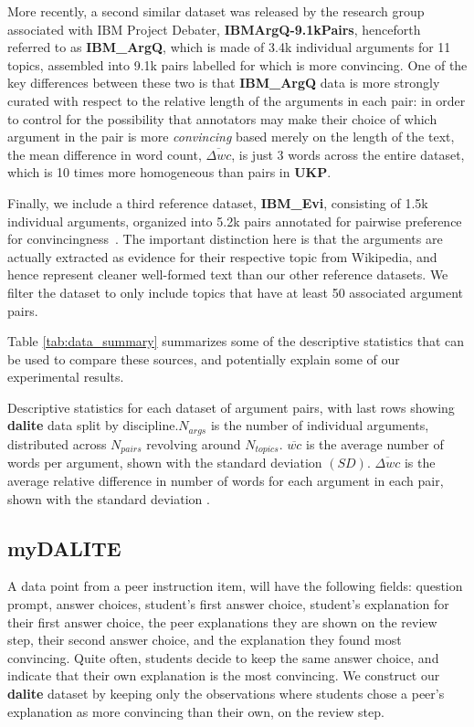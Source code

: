 \documentclass[runningheads]{llncs}
\begin{document}
More recently, a second similar dataset was released by the research group 
associated with IBM Project Debater, 
\textbf{IBMArgQ-9.1kPairs}\cite{toledo_automatic_2019}, henceforth 
referred to as \textbf{IBM\_ArgQ}, which is made of 3.4k individual arguments 
for 11 topics, assembled into 9.1k pairs labelled for which is more convincing. 
One of the key differences between these two is that \textbf{IBM\_ArgQ} data is 
more strongly curated with respect to the relative length of the arguments in 
each pair: in order to control for the possibility that annotators may make 
their choice of which argument in the pair is more \textit{convincing} based 
merely on the length of the text, the mean difference in word count, 
$\overline{\Delta wc}$, is just 3 words across the entire dataset, which is 10 
times more homogeneous than pairs in \textbf{UKP}.

Finally, we include a third reference dataset, \textbf{IBM\_Evi}, consisting of 
1.5k individual arguments, organized into 5.2k pairs annotated for pairwise 
preference for convincingness~\cite{gleize_are_2019}. The important distinction 
here is that the arguments are actually extracted as evidence for their 
respective topic from Wikipedia, and hence represent cleaner well-formed text 
than our other reference datasets. We filter the dataset to only include topics 
that have at least 50 associated argument pairs.

Table \ref{tab:data_summary} summarizes some of the descriptive statistics that 
can be used to compare these sources, and potentially explain some of our 
experimental results. 

\begin{table}
	\caption{Descriptive statistics for each dataset of argument pairs, with 
		last rows showing \textbf{dalite} data split by discipline.$N_{args}$ 
		is the number of individual arguments, distributed across $N_{pairs}$ 
		revolving around $N_{topics}$. $\overline{wc}$ is the average number of 
		words per argument, shown with the standard deviation $(SD)$. 
		$\overline{\Delta wc}$ is the average relative difference in number of 
		words for each argument in each pair, shown with the standard deviation 
		.}
	\centerline{}
	\label{tab:data_summary}
\end{table}

\subsection{myDALITE}
A data point from a peer instruction item, will have the following fields: 
question prompt, answer choices, student's first answer choice, student's 
explanation for their first answer choice, the peer explanations they are shown 
on the review step, their second answer choice, and the explanation they found 
most convincing.
Quite often, students decide to keep the same answer choice, and indicate that 
their own explanation is the most convincing.
We construct our \textbf{dalite} dataset by keeping only the observations where 
students chose a peer's explanation as more convincing than their own, on the 
review step.   
\end{document}

